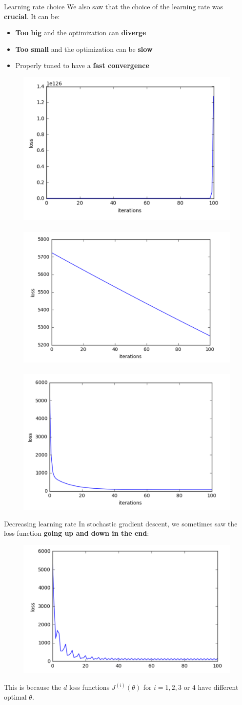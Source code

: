 \documentclass{beamer}
\newcommand{\1}[1]{\mathbbm{1}\left[#1\right]}
\begin{document}
\begin{frame}{Learning rate choice}
We also saw that the choice of the learning rate was \textbf{crucial}. It can be:
\begin{itemize}
	\item \textbf{Too big} and the optimization can \textbf{diverge}
	\item \textbf{Too small} and the optimization can be \textbf{slow}
	\item Properly tuned to have a \textbf{fast convergence}
\end{itemize}
\vfill
\pause
\begin{figure}
\centering
\includegraphics[width=.3\linewidth]{images/alpha_big.png}~
\includegraphics[width=.3\linewidth]{images/alpha_small.png}~
\includegraphics[width=.3\linewidth]{images/alpha_ok.png}
\end{figure}
\end{frame}

\begin{frame}{Decreasing learning rate}
In stochastic gradient descent, we sometimes saw the loss function \textbf{going up and down in the end}: 
\begin{figure}
\centering
\includegraphics[width=.8\linewidth]{images/sgd_constant_alpha.png}
\end{figure}
\vfill
\pause
This is because the $d$ loss functions $J^{(i)}(\theta)$ for $i = 1, 2, 3 \text{~or~} 4$ have different optimal $\theta$.
\end{frame}
\end{document}
